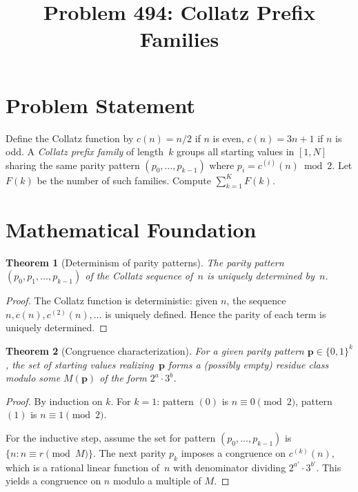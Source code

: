 \documentclass[12pt]{article}
\title{Problem 494: Collatz Prefix Families}
\author{}
\date{}
\newtheorem{theorem}{Theorem}
\begin{document}
\maketitle

\section{Problem Statement}
Define the Collatz function by $c(n) = n/2$ if $n$ is even, $c(n) = 3n+1$ if $n$ is odd. A \emph{Collatz prefix family} of length~$k$ groups all starting values in $[1, N]$ sharing the same parity pattern $(p_0, \ldots, p_{k-1})$ where $p_i = c^{(i)}(n) \bmod 2$. Let $F(k)$ be the number of such families. Compute $\sum_{k=1}^{K} F(k)$.

\section{Mathematical Foundation}

\begin{theorem}[Determinism of parity patterns]
The parity pattern $(p_0, p_1, \ldots, p_{k-1})$ of the Collatz sequence of~$n$ is uniquely determined by~$n$.
\end{theorem}

\begin{proof}
The Collatz function is deterministic: given $n$, the sequence $n, c(n), c^{(2)}(n), \ldots$ is uniquely defined. Hence the parity of each term is uniquely determined.
\end{proof}

\begin{theorem}[Congruence characterization]
For a given parity pattern $\mathbf{p} \in \{0,1\}^k$, the set of starting values realizing~$\mathbf{p}$ forms a (possibly empty) residue class modulo some $M(\mathbf{p})$ of the form $2^a \cdot 3^b$.
\end{theorem}

\begin{proof}
By induction on $k$. For $k = 1$: pattern $(0)$ is $n \equiv 0 \pmod{2}$, pattern $(1)$ is $n \equiv 1 \pmod{2}$.

For the inductive step, assume the set for pattern $(p_0, \ldots, p_{k-1})$ is $\{n : n \equiv r \pmod{M}\}$. The next parity $p_k$ imposes a congruence on $c^{(k)}(n)$, which is a rational linear function of~$n$ with denominator dividing $2^{a'}\cdot 3^{b'}$. This yields a congruence on $n$ modulo a multiple of $M$.
\end{proof}
\end{document}
